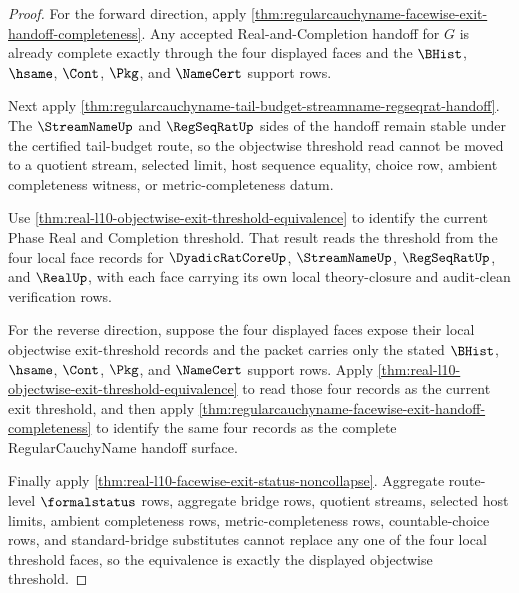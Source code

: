 \begin{proof}
For the forward direction, apply \autoref{thm:regularcauchyname-facewise-exit-handoff-completeness}. Any accepted Real-and-Completion handoff for $G$ is already complete exactly through the four displayed faces and the $\BHist$, $\hsame$, $\Cont$, $\Pkg$, and $\NameCert$ support rows.

Next apply \autoref{thm:regularcauchyname-tail-budget-streamname-regseqrat-handoff}. The $\StreamNameUp$ and $\RegSeqRatUp$ sides of the handoff remain stable under the certified tail-budget route, so the objectwise threshold read cannot be moved to a quotient stream, selected limit, host sequence equality, choice row, ambient completeness witness, or metric-completeness datum.

Use \autoref{thm:real-l10-objectwise-exit-threshold-equivalence} to identify the current Phase Real and Completion threshold. That result reads the threshold from the four local face records for $\DyadicRatCoreUp$, $\StreamNameUp$, $\RegSeqRatUp$, and $\RealUp$, with each face carrying its own local theory-closure and audit-clean verification rows.

For the reverse direction, suppose the four displayed faces expose their local objectwise exit-threshold records and the packet carries only the stated $\BHist$, $\hsame$, $\Cont$, $\Pkg$, and $\NameCert$ support rows. Apply \autoref{thm:real-l10-objectwise-exit-threshold-equivalence} to read those four records as the current exit threshold, and then apply \autoref{thm:regularcauchyname-facewise-exit-handoff-completeness} to identify the same four records as the complete RegularCauchyName handoff surface.

Finally apply \autoref{thm:real-l10-facewise-exit-status-noncollapse}. Aggregate route-level $\formalstatus$ rows, aggregate bridge rows, quotient streams, selected host limits, ambient completeness rows, metric-completeness rows, countable-choice rows, and standard-bridge substitutes cannot replace any one of the four local threshold faces, so the equivalence is exactly the displayed objectwise threshold.
\end{proof}

